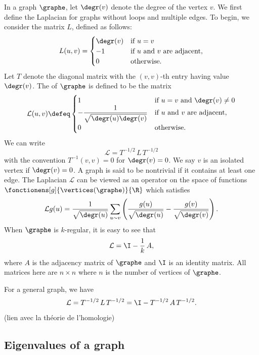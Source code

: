 In a graph $\graphe$, let $\degr(v)$ denote the degree of the vertex $v$. We first define the Laplacian for graphs without loops and multiple edges. To begin, we consider the matrix $L$, defined as follows:
\begin{equation}
L(u,v) = \begin{cases}
    \degr(v) &\text{if } u = v \\
    -1 &\text{if $u$ and $v$ are adjacent}, \\
    0 & \text{otherwise}.
\end{cases}
\end{equation}
Let $T$ denote the diagonal matrix with the $(v,v)$-th entry having value $\degr(v)$. The  of $\graphe$ is defined to be the matrix
\begin{equation}
\mathcal{L}(u,v) \defeq \begin{cases}
    1 & \text{if $u = v$ and $\degr(v) \not= 0$} \\
    - \displaystyle\frac{1}{\sqrt{\degr(u) \degr(v)}} & \text{if $u$ and $v$ are adjacent}, \\
    0 & \text{otherwise}. 
\end{cases}
\end{equation}
We can write
\[
\mathcal{L} = T^{-1/2} \, L \, T^{-1/2}
\]
with the convention $T^{-1}(v,v) = 0$ for $\degr(v) = 0$. We say $v$ is an isolated vertex if $\degr(v) = 0$. A graph is said to be nontrivial if it contains at least one edge. The Laplacian $\mathcal{L}$ can be viewed as an operator on the space of functions $\fonctionens[g]{\vertices(\graphe)}{\R}$ which satisfies
\[
\mathcal{L}g(u) = \frac{1}{\sqrt{\degr(u)}} \sum\limits_{u \sim v} \left( \frac{g(u)}{\sqrt{\degr(u)}} - \frac{g(v)}{\sqrt{\degr(v)}} \right).
\]
When $\graphe$ is $k$-regular, it is easy to see that
\[
\mathcal{L} = \I - \frac{1}{k} \, A,
\]
where $A$ is the adjacency matrix of $\graphe$ and $\I$ is an identity matrix. All matrices here are $n \times n$ where $n$ is the number of vertices of $\graphe$. 

For a general graph, we have
\[
    \mathcal{L} = T^{-1/2} \, L \, T^{-1/2} = \I - T^{-1/2} \, A \, T^{-1/2}.
\]
(lien avec la théorie de l'homologie)

\subsection{Eigenvalues of a graph \texorpdfstring{{\cite[Sec. 1.2]{chung_lectures_nodate}}}{[Chu, Sec. 1.4]}}

